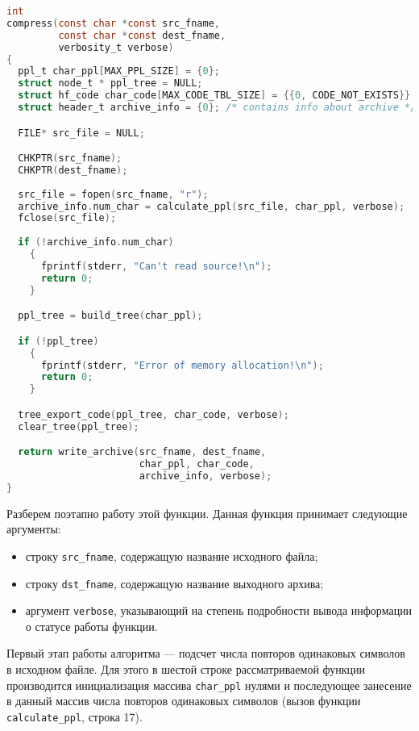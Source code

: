 \begin{lstlisting}[basicstyle=\scriptsize\ttfamily,
                   numberstyle=\scriptsize\ttfamily,
                   xleftmargin=7mm,
                   language=C,caption=Функция сжатия данных compress,
                   label=lst:compress]
int
compress(const char *const src_fname,
         const char *const dest_fname,
         verbosity_t verbose)
{
  ppl_t char_ppl[MAX_PPL_SIZE] = {0};
  struct node_t * ppl_tree = NULL; 
  struct hf_code char_code[MAX_CODE_TBL_SIZE] = {{0, CODE_NOT_EXISTS}};
  struct header_t archive_info = {0}; /* contains info about archive */

  FILE* src_file = NULL;

  CHKPTR(src_fname);
  CHKPTR(dest_fname);
  
  src_file = fopen(src_fname, "r");
  archive_info.num_char = calculate_ppl(src_file, char_ppl, verbose);
  fclose(src_file);
  
  if (!archive_info.num_char)
    {
      fprintf(stderr, "Can't read source!\n");
      return 0;
    }

  ppl_tree = build_tree(char_ppl);

  if (!ppl_tree)
    {
      fprintf(stderr, "Error of memory allocation!\n");
      return 0;
    }

  tree_export_code(ppl_tree, char_code, verbose);
  clear_tree(ppl_tree);

  return write_archive(src_fname, dest_fname,
                       char_ppl, char_code,
                       archive_info, verbose);
}
\end{lstlisting}

Разберем поэтапно работу этой функции. 
Данная функция принимает следующие аргументы:
\begin{itemize}
\item строку \texttt{src\_fname}, содержащую название исходного файла;
\item строку \texttt{dst\_fname}, содержащую название выходного архива;
\item аргумент \texttt{verbose}, указывающий на степень подробности вывода
  информации о статусе работы функции.
\end{itemize}

Первый этап работы алгоритма --- подсчет числа повторов одинаковых символов 
в исходном файле. Для этого в шестой строке рассматриваемой функции производится
инициализация массива \texttt{char\_ppl} нулями и последующее занесение 
в данный массив числа повторов одинаковых символов
(вызов функции \texttt{calculate\_ppl}, строка 17).

